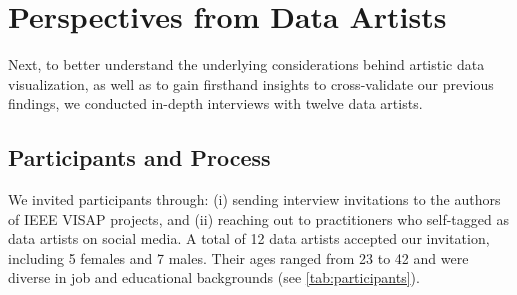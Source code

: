 \section{Perspectives from Data Artists}
\label{sec:interview}

Next, to better understand the underlying considerations behind artistic data visualization, as well as to gain firsthand insights to cross-validate our previous findings, we conducted in-depth interviews with twelve data artists.


\subsection{Participants and Process}
\label{sssec:interviewprocess}

We invited participants through: (i) sending interview invitations to the authors of IEEE VISAP projects, and (ii) reaching out to practitioners who self-tagged as data artists on social media.
A total of 12 data artists accepted our invitation, including 5 females and 7 males. Their ages ranged from 23 to 42 and were diverse in job and educational backgrounds (see \autoref{tab:participants}). 

